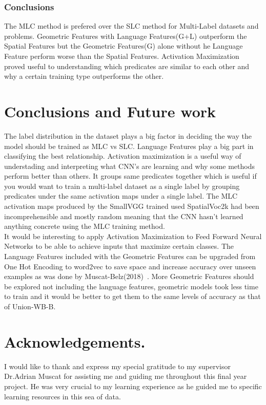 \documentclass{IEEEtran}
\begin{document}
\subsubsection{Conclusions}
The MLC method is prefered over the SLC method for Multi-Label datasets and problems. Geometric Features with Language Features(G+L) outperform the Spatial Features but the Geometric Features(G) alone without he Language Feature perform worse than the Spatial Features. Activation Maximization proved useful to understanding which predicates are similar to each other and why a certain training type outperforms the other.

\section{Conclusions and Future work}
The label distribution in the dataset plays a big factor in deciding the way the model should be trained as MLC vs SLC. Language Features play a big part in classifying the best relationship. Activation maximization is a useful way of understading and interpreting what CNN's are learning and why some methods perform better than others. It groups same predicates together which is useful if you would want to train a multi-label dataset as a single label by grouping predicates under the same activation maps under a single label. The MLC activation maps produced by the SmallVGG trained used SpatialVoc2k had been incomprehensible and mostly random meaning that the CNN hasn't learned anything concrete using the MLC training method.
\\
It would be interesting to apply Activation Maximization to Feed Forward Neural Networks to be able to achieve inputs that maximize certain classes. The Language Features included with the Geometric Features can be upgraded from One Hot Encoding to word2vec to save space and increase accuracy over unseen examples as was done by Muscat-Belz(2018)~\cite{belz-etal-2018-spatialvoc2k}. More Geometric Features should be explored not including the language features, geometric models took less time to train and it would be better to get them to the same levels of accuracy as that of Union-WB-B.

\section*{Acknowledgements.}
I would like to thank and express my special gratitude to my supervisor Dr.Adrian Muscat for assisting me and guiding me throughout this final year project. He was very crucial to my learning experience as he guided me to specific learning resources in this sea of data.

{}

\end{document}
